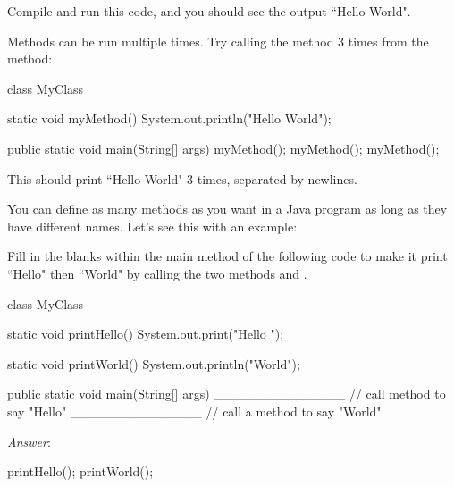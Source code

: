 Compile and run this code, and you should see the output ``Hello World". 

Methods can be run multiple times. Try calling the  method 3 times from the  method:

\begin{code}
class MyClass {
  static void myMethod() {
    System.out.println("Hello World");
  }

  public static void main(String[] args) {
    myMethod();
    myMethod();
    myMethod();
  }
}
\end{code}

This should print ``Hello World" 3 times, separated by newlines. 

You can define as many methods as you want in a Java program as long as they have different names. Let's see this with an example: 

\begin{example}
Fill in the blanks within the main method of the following code to make it print ``Hello" then ``World" by calling the two methods  and . 
\begin{code}
class MyClass {

    static void printHello() {
        System.out.print("Hello ");
    }
    
    static void printWorld() {
        System.out.println("World");
    }

    public static void main(String[] args) {
        ______________ // call method to say "Hello"
        ______________ // call a method to say "World"
    }
}
\end{code}
\noindent \emph{Answer}:
\begin{code}
    printHello();
    printWorld();
\end{code}
\end{example}


